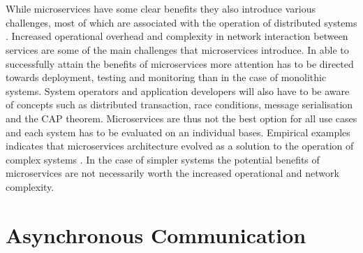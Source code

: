 \\ \\
While microservices have some clear benefits they also introduce various challenges, most of which are associated with the operation of distributed systems \cite{deutsch2004eight}. Increased operational overhead and complexity in network interaction between services are some of the main challenges that microservices introduce. In able to successfully attain the benefits of microservices more attention has to be directed towards deployment, testing and monitoring than in the case of monolithic systems. System operators and application developers will also have to be aware of concepts such as distributed transaction, race conditions, message serialisation and the CAP theorem. Microservices are thus not the best option for all use cases and each system has to be evaluated on an individual bases. Empirical examples indicates that microservices architecture evolved as a solution to the operation of complex systems \cite{thones2015microservices, microservicesNetflix}. In the case of simpler systems the potential benefits of microservices are not necessarily worth the increased operational and network complexity.

\section{Asynchronous Communication}

